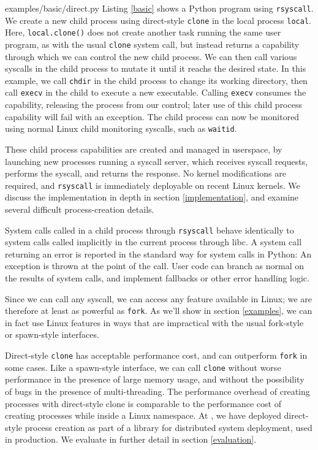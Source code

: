 \documentclass[letterpaper,twocolumn,10pt]{article}
\begin{document}

{examples/basic/direct.py}
Listing \ref{basic} shows a Python program using \texttt{rsyscall}.
We create a new child process using direct-style \texttt{clone} in the local process \verb|local|.
Here, \texttt{local.clone()} does not create another task running the same user program,
as with the usual \texttt{clone} system call,
but instead returns a capability through which we can control the new child process.
We can then call various syscalls in the child process to mutate it until it reachs the desired state.
In this example,
we call \texttt{chdir} in the child process to change its working directory,
then call \texttt{execv} in the child to execute a new executable.
Calling \texttt{execv} consumes the capability,
releasing the process from our control;
later use of this child process capability will fail with an exception.
The child process can now be monitored using normal Linux child monitoring syscalls,
such as \texttt{waitid}.

These child process capabilities are created and managed in userspace,
by launching new processes running a syscall server,
which receives syscall requests, performs the syscall, and returns the response.
No kernel modifications are required, and \texttt{rsyscall} is immediately deployable on recent Linux kernels.
We discuss the implementation in depth in section \ref{implementation},
and examine several difficult process-creation details.

System calls called in a child process through \texttt{rsyscall}
behave identically to system calls called implicitly in the current process through libc.
A system call returning an error is reported in the standard way for system calls in Python:
An exception is thrown at the point of the call.
User code can branch as normal on the results of system calls,
and implement fallbacks or other error handling logic.

Since we can call any syscall,
we can access any feature available in Linux; we are therefore at least as powerful as \texttt{fork}.
As we'll show in section \ref{examples},
we can in fact use Linux features in ways that are impractical with the usual fork-style or spawn-style interfaces.

Direct-style \texttt{clone} has acceptable performance cost,
and can outperform \texttt{fork} in some cases.
Like a spawn-style interface,
we can call \texttt{clone}
without worse performance in the presence of large memory usage,
and without the possibility of bugs in the presence of multi-threading.
The performance overhead of creating processes with direct-style clone
is comparable to the performance cost of creating processes while inside a Linux namespace.
At \twosigma, we have deployed direct-style process creation
as part of a library for distributed system deployment, used in production.
We evaluate in further detail in section \ref{evaluation}.
\end{document}
